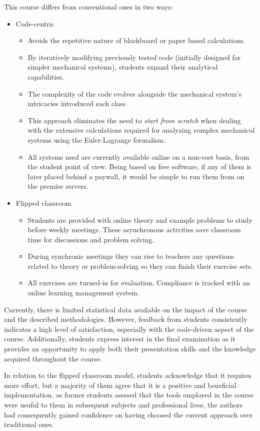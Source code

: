This course differs from conventional ones in two ways:
\begin{itemize}
    \item Code-centric%
    \begin{itemize}
        \item Avoids the repetitive nature of blackboard or paper based calculations. 
        \item By iteratively modifying previously tested code (initially designed for simpler mechanical systems), students expand their analytical capabilities.
        \item The complexity of the code evolves alongside the mechanical system’s intricacies introduced each class.
        \item This approach eliminates the need to \textit{start from scratch} when dealing with the extensive calculations required for analyzing complex mechanical systems using the Euler-Lagrange formalism.
        \item All systems used are currently available online on a non-cost basis, from the student point of view. Being based on free software, if any of them is later placed behind a paywall, it would be simple to run them from on the premise servers.
    \end{itemize}
    \item Flipped classroom
    \begin{itemize}
        \item Students are provided with online theory and example problems to study before weekly meetings. These asynchronous activities save classroom time for discussions and problem solving.
        \item During synchronic meetings they can rise to teachers any questions related to theory or problem-solving so they can finish their exercise sets.
        \item All exercises are turned-in for evaluation. Compliance is tracked with an online learning management system. 
    \end{itemize}
\end{itemize}
Currently, there is limited statistical data available on the impact of the course and the described methodologies.
However, feedback from students consistently indicates a high level of satisfaction, especially with the code-driven aspect of the course.
Additionally, students express interest in the final examination as it provides an opportunity to apply both their presentation skills and the knowledge acquired throughout the course.

In relation to the flipped classroom model, students acknowledge that it requires more effort, but a majority of them agree that it is a positive and beneficial implementation.
as former students assesed that the tools employed in the course were usuful to them in subsequent subjects and professional lives, the authors had consequently gained confidence on having choosed the current approach over traditional ones.

